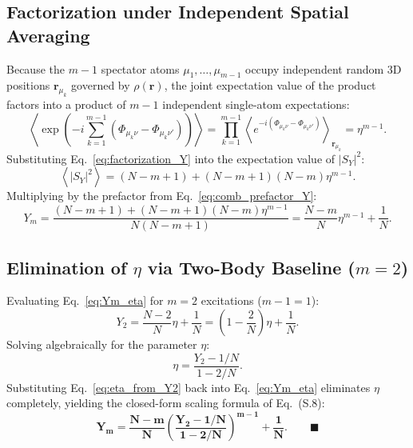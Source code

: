 \documentclass[11pt,a4paper]{article}
\begin{document}
\subsection{Factorization under Independent Spatial Averaging}
Because the $m - 1$ spectator atoms $\mu_1, \dots, \mu_{m-1}$ occupy independent random 3D positions $\mathbf{r}_{\mu_k}$ governed by $\rho(\mathbf{r})$, the joint expectation value of the product factors into a product of $m - 1$ independent single-atom expectations:
\begin{equation}
    \left\langle \exp\left( -i \sum_{k=1}^{m-1} \left( \Phi_{\mu_k \nu} - \Phi_{\mu_k \nu'} \right) \right) \right\rangle = \prod_{k=1}^{m-1} \left\langle e^{-i(\Phi_{\mu_k \nu} - \Phi_{\mu_k \nu'})} \right\rangle_{\mathbf{r}_{\mu_k}} = \eta^{m-1}.
    \label{eq:factorization_Y}
\end{equation}
Substituting Eq.~\eqref{eq:factorization_Y} into the expectation value of $|S_Y|^2$:
\begin{equation}
    \left\langle |S_Y|^2 \right\rangle = (N - m + 1) + (N - m + 1)(N - m) \eta^{m-1}.
\end{equation}
Multiplying by the prefactor from Eq.~\eqref{eq:comb_prefactor_Y}:
\begin{equation}
    Y_m = \frac{(N - m + 1) + (N - m + 1)(N - m) \eta^{m-1}}{N(N - m + 1)} = \frac{N - m}{N} \eta^{m-1} + \frac{1}{N}.
    \label{eq:Ym_eta}
\end{equation}

\subsection{Elimination of $\eta$ via Two-Body Baseline ($m = 2$)}
Evaluating Eq.~\eqref{eq:Ym_eta} for $m = 2$ excitations ($m - 1 = 1$):
\begin{equation}
    Y_2 = \frac{N - 2}{N} \eta + \frac{1}{N} = \left( 1 - \frac{2}{N} \right) \eta + \frac{1}{N}.
\end{equation}
Solving algebraically for the parameter $\eta$:
\begin{equation}
    \eta = \frac{Y_2 - 1/N}{1 - 2/N}.
    \label{eq:eta_from_Y2}
\end{equation}
Substituting Eq.~\eqref{eq:eta_from_Y2} back into Eq.~\eqref{eq:Ym_eta} eliminates $\eta$ completely, yielding the closed-form scaling formula of Eq.~(S.8):
\begin{equation}
    \mathbf{Y_m = \frac{N - m}{N} \left( \frac{Y_2 - 1/N}{1 - 2/N} \right)^{m-1} + \frac{1}{N}.} \qquad \blacksquare
\end{equation}
\end{document}
